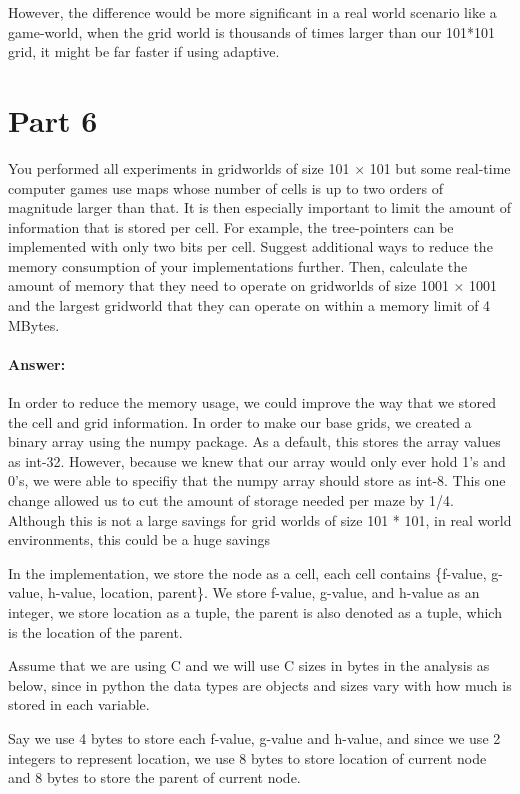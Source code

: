 \documentclass[11pt]{report}
\begin{document}
However, the difference would be more significant in a real world scenario like a game-world, when the grid world is thousands of times larger than our 101*101 grid, it might be far faster if using adaptive.


\newpage

\section*{Part 6}
You performed all experiments in gridworlds of size 101 × 101 but some real-time computer games use maps whose number of cells is up to two orders of magnitude larger than that. It is then especially important to limit the amount of information that is stored per cell. For example, the tree-pointers can be implemented with only two bits per cell. Suggest additional ways to reduce the memory consumption of your implementations further. Then, calculate the amount of memory that they need to operate on gridworlds of size 1001 × 1001 and the largest gridworld that they can operate on within a memory limit of 4 MBytes.\\

\paragraph{Answer:}
In order to reduce the memory usage, we could improve the way that we stored the cell  and grid information. In order to make our base grids, we created a binary array using the numpy package. As a default, this stores the array values as int-32. However, because we knew that our array would only ever hold 1's and 0's, we were able to specifiy that the numpy array should store as int-8. This one change allowed us to cut the amount of storage needed per maze by 1/4. Although this is not a large savings for grid worlds of size 101 * 101, in real world environments, this could be a huge savings

In the implementation, we store the node as a cell, each cell contains \{f-value, g-value, h-value, location, parent\}. We store f-value, g-value, and h-value as an integer, we store location as a tuple, the parent is also denoted as a tuple, which is the location of the parent.

Assume that we are using C and we will use C sizes in bytes in the analysis as below, since in python the data types are objects and sizes vary with how much is stored in each variable.

Say we use 4 bytes to store each f-value, g-value and h-value, and since we use 2 integers to represent location, we use 8 bytes to store location of current node and 8 bytes to store the parent of current node.
\end{document}
